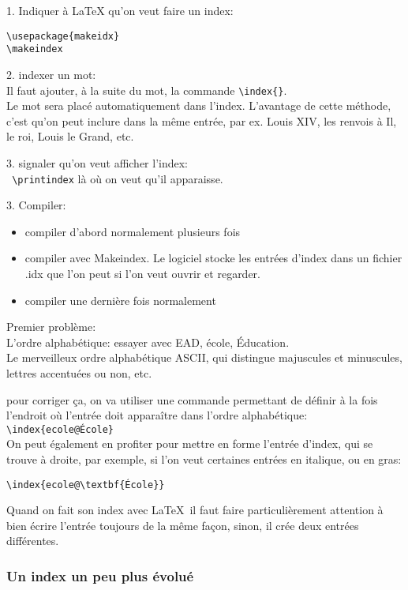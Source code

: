 \documentclass[a4paper,twoside,french,12pt]{book}
\begin{document}
1. Indiquer à \LaTeX{} qu'on veut faire un index: 
\begin{verbatim}
\usepackage{makeidx}
\makeindex
\end{verbatim}

2. indexer un mot:\\
Il faut ajouter, à la suite du mot, la commande \verb=\index{}=.\\
Le mot sera placé automatiquement dans l'index. L'avantage de cette méthode, c'est qu'on peut inclure dans la même entrée, par ex. Louis XIV, les renvois à Il, le roi, Louis le Grand, etc.

3. signaler qu'on veut afficher l'index:\\
\verb= \printindex= là où on veut qu'il apparaisse.

3. Compiler: 
\begin{itemize}
\item compiler d'abord normalement plusieurs fois
\item compiler avec Makeindex. Le logiciel stocke les entrées d'index dans un fichier .idx que l'on peut si l'on veut ouvrir et regarder.
\item compiler une dernière fois normalement
\end{itemize}

Premier problème: \\
L'ordre alphabétique: essayer avec EAD, école, Éducation.\\
Le merveilleux ordre alphabétique ASCII, qui distingue majuscules et minuscules, lettres accentuées ou non, etc.


pour corriger ça, on va utiliser une commande permettant de définir à la fois l'endroit où l'entrée doit apparaître dans l'ordre alphabétique:\\
\verb=\index{ecole@École}=\\

On peut également en profiter pour mettre en forme l'entrée d'index, qui se trouve à droite, par exemple, si l'on veut certaines entrées en italique, ou en gras:
\begin{verbatim}
\index{ecole@\textbf{École}}
\end{verbatim}


Quand on fait son index avec \LaTeX\ il faut faire particulièrement attention à bien écrire l'entrée toujours de la même façon, sinon, il crée deux entrées différentes.

\subsubsection{Un index un peu plus évolué}
\end{document}
